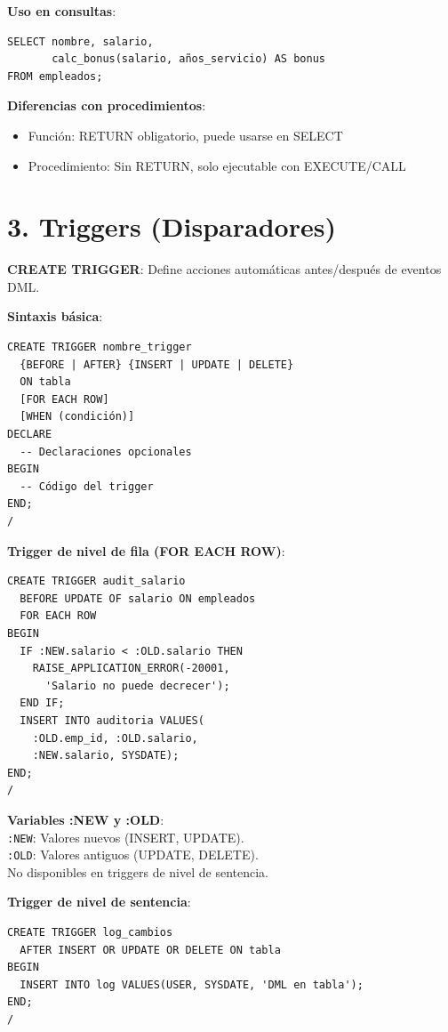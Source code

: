 \documentclass[8pt,a4paper,twocolumn]{article}
\begin{document}
\textbf{Uso en consultas}:
\begin{lstlisting}
SELECT nombre, salario, 
       calc_bonus(salario, años_servicio) AS bonus
FROM empleados;
\end{lstlisting}

\textbf{Diferencias con procedimientos}:
\begin{itemize}
\item Función: RETURN obligatorio, puede usarse en SELECT
\item Procedimiento: Sin RETURN, solo ejecutable con EXECUTE/CALL
\end{itemize}

\section*{3. Triggers (Disparadores)}

\textbf{CREATE TRIGGER}: Define acciones automáticas antes/después de eventos DML.

\textbf{Sintaxis básica}:
\begin{lstlisting}
CREATE TRIGGER nombre_trigger
  {BEFORE | AFTER} {INSERT | UPDATE | DELETE}
  ON tabla
  [FOR EACH ROW]
  [WHEN (condición)]
DECLARE
  -- Declaraciones opcionales
BEGIN
  -- Código del trigger
END;
/
\end{lstlisting}

\textbf{Trigger de nivel de fila (FOR EACH ROW)}:
\begin{lstlisting}
CREATE TRIGGER audit_salario
  BEFORE UPDATE OF salario ON empleados
  FOR EACH ROW
BEGIN
  IF :NEW.salario < :OLD.salario THEN
    RAISE_APPLICATION_ERROR(-20001,
      'Salario no puede decrecer');
  END IF;
  INSERT INTO auditoria VALUES(
    :OLD.emp_id, :OLD.salario, 
    :NEW.salario, SYSDATE);
END;
/
\end{lstlisting}

\textbf{Variables :NEW y :OLD}:\\
\texttt{:NEW}: Valores nuevos (INSERT, UPDATE).\\
\texttt{:OLD}: Valores antiguos (UPDATE, DELETE).\\
No disponibles en triggers de nivel de sentencia.

\textbf{Trigger de nivel de sentencia}:
\begin{lstlisting}
CREATE TRIGGER log_cambios
  AFTER INSERT OR UPDATE OR DELETE ON tabla
BEGIN
  INSERT INTO log VALUES(USER, SYSDATE, 'DML en tabla');
END;
/
\end{lstlisting}
\end{document}
